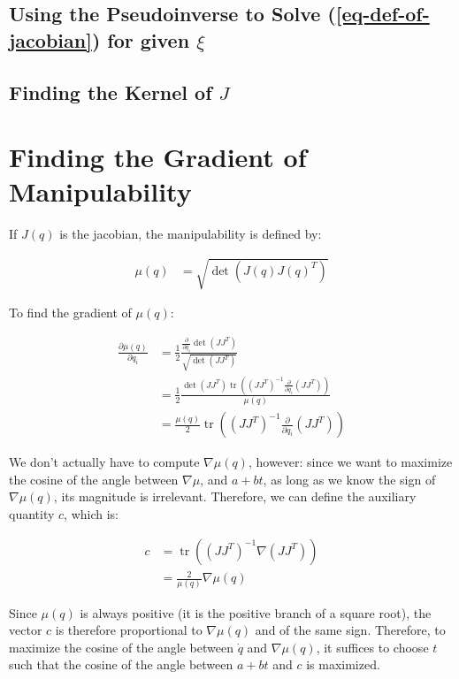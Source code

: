 \documentclass{article}
\DeclareMathOperator{\tr}{tr}
\begin{document}
\subsection{Using the Pseudoinverse to Solve (\ref{eq-def-of-jacobian}) for
	given $\xi$}

\subsection{Finding the Kernel of $J$}


\section{Finding the Gradient of Manipulability}

If $J(q)$ is the jacobian, the manipulability is defined by:

\begin{align}
	\mu(q) & = \sqrt{ \det \left( J(q) J(q)^T \right) }  \label{eq-def-of-mu}
\end{align}

To find the gradient of $\mu(q)$:

\begin{align*}
	\frac {\partial \mu(q)}{\partial q_i}
		& = \frac 12 \frac {\frac{\partial}{\partial q_i} \det \left( J J^T \right)}
			{ \sqrt{ \det \left( J J^T \right) }}\\
		& = \frac 12 \frac {\det \left( J J^T\right) 
			\tr \left( (J J^T)^{-1} \frac{\partial}{\partial q_i} (J J^T) \right)}
		{\mu(q)}\\
		& = \frac{\mu(q)}2 \tr \left( (J J^T)^{-1} \frac{\partial}{\partial q_i} (J J^T) \right)
\end{align*} 

We don't actually have to compute $\nabla \mu(q)$, however:
	since we want to maximize the cosine of the angle between $\nabla \mu$,
	and $a + b t$, as long as we know the sign of $\nabla \mu(q)$, its magnitude
	is irrelevant.
Therefore, we can define the auxiliary quantity $c$, which is:

\begin{align}
	c & = \tr \left( (J J^T)^{-1} \nabla (J J^T) \right) \label{eq-def-of-c}\\
	& = \frac{2 }{\mu(q)} \nabla \mu(q) \nonumber
\end{align}

Since $\mu(q)$ is always positive (it is the positive branch of a square root),
	the vector $c$ is therefore proportional to $\nabla \mu(q)$ and of the same
	sign.
Therefore, to maximize the cosine of the angle between $\dot{q}$ and $\nabla \mu(q)$,
	it suffices to choose $t$ such that the cosine of the angle between $a + b t$
	and $c$ is maximized.
\end{document}
